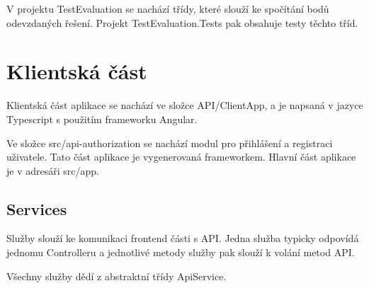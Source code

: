 V projektu TestEvaluation se nachází třídy, které slouží ke spočítání bodů odevzdaných řešení. Projekt TestEvaluation.Tests pak obsahuje testy těchto tříd.

\newpage

\section{Klientská část}
\lstset{style=typescript}

Klientská část aplikace se nachází ve složce API/ClientApp, a je napsaná v jazyce Typescript s použitím frameworku Angular. 

Ve složce src/api-authorization se nachází modul pro přihlášení a registraci uživatele. Tato část aplikace je vygenerovaná frameworkem. Hlavní část aplikace je v adresáři src/app.

\subsection{Services}

Služby slouží ke komunikaci frontend části s API. Jedna služba typicky odpovídá jednomu Controlleru a jednotlivé metody služby pak slouží k volání metod API. 

Všechny služby dědí z abstraktní třídy ApiService. 

